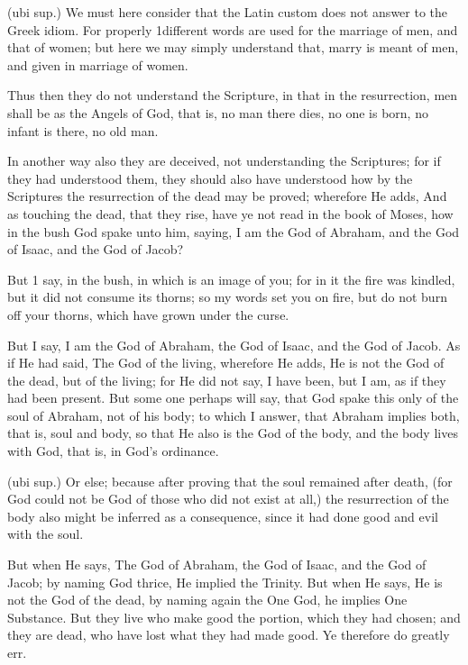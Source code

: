 (ubi sup.) We must here consider that the Latin custom does not answer to the Greek idiom. For properly 1different words are used for the marriage of men, and that of women; but here we may simply understand that, marry is meant of men, and given in marriage of women.

 Thus then they do not understand the Scripture, in that in the resurrection, men shall be as the Angels of God, that is, no man there dies, no one is born, no infant is there, no old man.

 In another way also they are deceived, not understanding the Scriptures; for if they had understood them, they should also have understood how by the Scriptures the resurrection of the dead may be proved; wherefore He adds, And as touching the dead, that they rise, have ye not read in the book of Moses, how in the bush God spake unto him, saying, I am the God of Abraham, and the God of Isaac, and the God of Jacob?

 But 1 say, in the bush, in which is an image of you; for in it the fire was kindled, but it did not consume its thorns; so my words set you on fire, but do not burn off your thorns, which have grown under the curse.

 But I say, I am the God of Abraham, the God of Isaac, and the God of Jacob. As if He had said, The God of the living, wherefore He adds, He is not the God of the dead, but of the living; for He did not say, I have been, but I am, as if they had been present. But some one perhaps will say, that God spake this only of the soul of Abraham, not of his body; to which I answer, that Abraham implies both, that is, soul and body, so that He also is the God of the body, and the body lives with God, that is, in God’s ordinance.

 (ubi sup.) Or else; because after proving that the soul remained after death, (for God could not be God of those who did not exist at all,) the resurrection of the body also might be inferred as a consequence, since it had done good and evil with the soul.

 But when He says, The God of Abraham, the God of Isaac, and the God of Jacob; by naming God thrice, He implied the Trinity. But when He says, He is not the God of the dead, by naming again the One God, he implies One Substance. But they live who make good the portion, which they had chosen; and they are dead, who have lost what they had made good. Ye therefore do greatly err.

